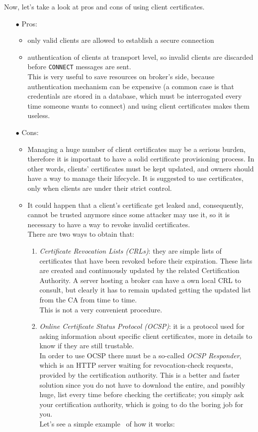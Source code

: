 \documentclass[12pt]{report}
\begin{document}
{{Now, let's take a look at pros and cons of using client certificates.
\begin{itemize}
\setlength{\itemindent}{+4mm}
\item[$\bullet$] Pros:
\begin{itemize}
\item only valid clients are allowed to establish a secure connection
\item authentication of clients at transport level, so invalid clients are discarded before \texttt{CONNECT} messages are sent.\\ 
This is very useful to save resources on broker's side, because authentication mechanism can be expensive (a common case is that credentials are stored in a database, which must be interrogated every time someone wants to connect) and using client certificates makes them useless.
\end{itemize}

\item[$\bullet$] Cons:
\begin{itemize}
\item Managing a huge number of client certificates may be a serious burden, therefore it is important to have a solid certificate provisioning process. In other words, clients' certificates must be kept updated, and owners should have a way to manage their lifecycle.
It is suggested to use certificates, only when clients are under their strict control.
\item It could happen that a client's certificate get leaked and, consequently, cannot be trusted anymore since some attacker may use it, so it is necessary to have a way to revoke invalid certificates.\\
There are two ways to obtain that:

\begin{enumerate}
\item \emph{Certificate Revocation Lists (CRLs)}: they are simple lists of certificates that have been revoked before their expiration.
These lists are created and continuously updated by the related Certification Authority.
A server hosting a broker can have a own local CRL to consult, but clearly it has to remain updated getting the updated list from the CA from time to time.\\
This is not a very convenient procedure.
\item \emph{Online Certificate Status Protocol (OCSP)}:  it is a protocol used for asking information about specific client certificates, more in details to know if they are still trustable.\\
In order to use OCSP there must be a so-called \emph{OCSP Responder}, which is an HTTP server waiting for revocation-check requests, provided by the certification authority.
This is a better and faster solution since you do not have to download the entire, and possibly huge, list every time before checking the certificate; you simply ask your certification authority, which is going to do the boring job for you.\\
Let's see a simple example~\cite{ocspwiki} of how it works:


\end{enumerate}
\end{itemize}
\end{itemize}}}
\end{document}
